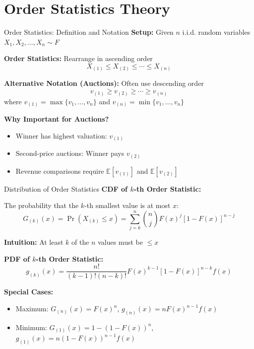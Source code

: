 \documentclass[xcolor={x11names}]{beamer}
\begin{document}
\section{Order Statistics Theory}

\begin{frame}{Order Statistics: Definition and Notation}
\textbf{Setup:} Given $n$ i.i.d. random variables $X_1, X_2, \ldots, X_n \sim F$


\textbf{Order Statistics:} Rearrange in ascending order
\[X_{(1)} \leq X_{(2)} \leq \cdots \leq X_{(n)}\]


\textbf{Alternative Notation (Auctions):} Often use descending order
\[v_{(1)} \geq v_{(2)} \geq \cdots \geq v_{(n)}\]
where $v_{(1)} = \max\{v_1, \ldots, v_n\}$ and $v_{(n)} = \min\{v_1, \ldots, v_n\}$


\textbf{Why Important for Auctions?}
\begin{itemize}
  \item Winner has highest valuation: $v_{(1)}$
  \item Second-price auctions: Winner pays $v_{(2)}$
  \item Revenue comparisons require $\mathbb{E}[v_{(1)}]$ and $\mathbb{E}[v_{(2)}]$
\end{itemize}
\end{frame}

\begin{frame}{Distribution of Order Statistics}
\textbf{CDF of $k$-th Order Statistic:}

The probability that the $k$-th smallest value is at most $x$:
\[G_{(k)}(x) = \Pr(X_{(k)} \leq x) = \sum_{j=k}^n \binom{n}{j} F(x)^j [1-F(x)]^{n-j}\]

\textbf{Intuition:} At least $k$ of the $n$ values must be $\leq x$


\textbf{PDF of $k$-th Order Statistic:}
\[g_{(k)}(x) = \frac{n!}{(k-1)!(n-k)!} F(x)^{k-1}[1-F(x)]^{n-k}f(x)\]

\textbf{Special Cases:}
\begin{itemize}
  \item Maximum: $G_{(n)}(x) = F(x)^n$, $g_{(n)}(x) = nF(x)^{n-1}f(x)$
  \item Minimum: $G_{(1)}(x) = 1-(1-F(x))^n$, $g_{(1)}(x) = n(1-F(x))^{n-1}f(x)$
\end{itemize}
\end{frame}
\end{document}
